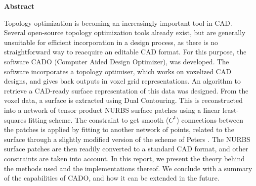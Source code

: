 

\clearemptydoublepage
{}
{}	





\vspace*{2cm}
\begin{center}
{\Large \bf Abstract}
\end{center}
\vspace{1cm}

Topology optimization is becoming an increasingly important tool in CAD. Several open-source topology optimization tools already exist, but are generally unsuitable for efficient incorporation in a design process, as there is no straightforward way to reacquire an editable CAD format. For this purpose, the software CADO (Computer Aided Design Optimizer), was developed. The software incorporates a topology optimiser, which works on voxelized CAD designs, and gives back outputs in voxel grid representations. An algorithm to retrieve a CAD-ready surface representation of this data was designed. From the voxel data, a surface is extracted using Dual Contouring. This is reconstructed into a network of tensor product NURBS surface patches using a linear least-squares fitting scheme. The constraint to get smooth ($C^1$) connections between the patches is applied by fitting to another network of points, related to the surface through a slightly modified version of the scheme of Peters \cite{peters1992constructing}. The NURBS surface patches are then readily converted to a standard CAD format, and other constraints are taken into account. In this report, we present the theory behind the methods used and the implementations thereof. We conclude with a summary of the capabilities of CADO, and how it can be extended in the future.
%
%
